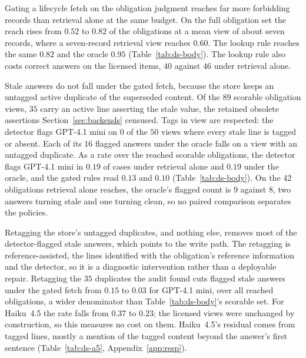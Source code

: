 \documentclass{article}
\begin{document}
Gating a lifecycle fetch on the obligation judgment reaches far more forbidding records than retrieval alone at the same budget.
On the full obligation set the reach rises from $0.52$ to $0.82$ of the obligations at a mean view of about seven records, where a seven-record retrieval view reaches $0.60$.
The lookup rule reaches the same $0.82$ and the oracle $0.95$ (Table~\ref{tab:ds-body}).
The lookup rule also costs correct answers on the licensed items, $40$ against $46$ under retrieval alone.

Stale answers do not fall under the gated fetch, because the store keeps an untagged active duplicate of the superseded content.
Of the $89$ scorable obligation views, $35$ carry an active line asserting the stale value, the retained obsolete assertions Section~\ref{sec:backends} censused.
Tags in view are respected: the detector flags GPT-4.1 mini on $0$ of the $50$ views where every stale line is tagged or absent.
Each of its $16$ flagged answers under the oracle falls on a view with an untagged duplicate.
As a rate over the reached scorable obligations, the detector flags GPT-4.1 mini in $0.19$ of cases under retrieval alone and $0.19$ under the oracle, and the gated rules read $0.13$ and $0.10$ (Table~\ref{tab:ds-body}).
On the $42$ obligations retrieval alone reaches, the oracle's flagged count is $9$ against $8$, two answers turning stale and one turning clean, so no paired comparison separates the policies.

Retagging the store's untagged duplicates, and nothing else, removes most of the detector-flagged stale answers, which points to the write path.
The retagging is reference-assisted, the lines identified with the obligation's reference information and the detector, so it is a diagnostic intervention rather than a deployable repair.
Retagging the $35$ duplicates the audit found cuts flagged stale answers under the gated fetch from $0.15$ to $0.03$ for GPT-4.1 mini, over all reached obligations, a wider denominator than Table~\ref{tab:ds-body}'s scorable set.
For Haiku~4.5 the rate falls from $0.37$ to $0.23$; the licensed views were unchanged by construction, so this measures no cost on them.
Haiku~4.5's residual comes from tagged lines, mostly a mention of the tagged content beyond the answer's first sentence (Table~\ref{tab:ds-a5}, Appendix~\ref{app:resp}).
\end{document}
